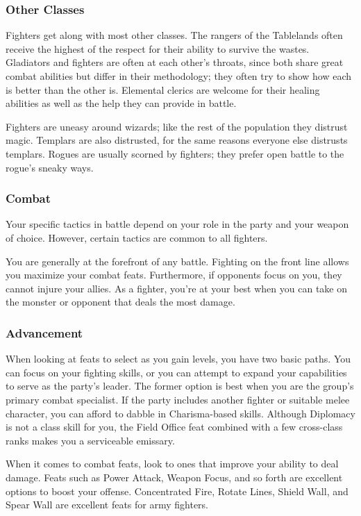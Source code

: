 \subsubsection{Other Classes}

Fighters get along with most other classes. The rangers of the Tablelands often receive the highest of the respect for their ability to survive the wastes. Gladiators and fighters are often at each other's throats, since both share great combat abilities but differ in their methodology; they often try to show how each is better than the other is. Elemental clerics are welcome for their healing abilities as well as the help they can provide in battle.

Fighters are uneasy around wizards; like the rest of the population they distrust magic. Templars are also distrusted, for the same reasons everyone else distrusts templars. Rogues are usually scorned by fighters; they prefer open battle to the rogue's sneaky ways.

\subsubsection{Combat}

Your specific tactics in battle depend on your role in the party and your weapon of choice. However, certain tactics are common to all fighters.

You are generally at the forefront of any battle. Fighting on the front line allows you maximize your combat feats. Furthermore, if opponents focus on you, they cannot injure your allies. As a fighter, you're at your best when you can take on the monster or opponent that deals the most damage.

\subsubsection{Advancement}

When looking at feats to select as you gain levels, you have two basic paths. You can focus on your fighting skills, or you can attempt to expand your capabilities to serve as the party's leader. The former option is best when you are the group's primary combat specialist. If the party includes another fighter or suitable melee character, you can afford to dabble in Charisma-based skills. Although Diplomacy is not a class skill for you, the Field Office feat combined with a few cross-class ranks makes you a serviceable emissary.

When it comes to combat feats, look to ones that improve your ability to deal damage. Feats such as Power Attack, Weapon Focus, and so forth are excellent options to boost your offense. Concentrated Fire, Rotate Lines, Shield Wall, and Spear Wall are excellent feats for army fighters.

